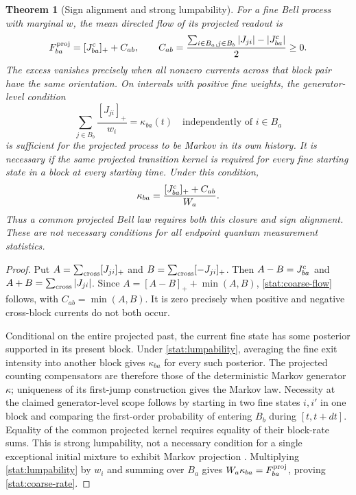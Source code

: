 \documentclass[11pt,oneside,openany]{book}
\newtheorem{theorem}{Theorem}[chapter]
\theoremstyle{definition}
\theoremstyle{remark}\newtheorem{remark}[theorem]{Remark}
\begin{document}
\begin{theorem}[Sign alignment and strong lumpability]
\label{stat:coarse}
For a fine Bell process with marginal $w$, the mean directed flow of its
projected readout is
\begin{equation}\label{stat:coarse-flow}
 F^{\rm proj}_{ba}=[J^{\rm c}_{ba}]_++C_{ab},\qquad
 C_{ab}=\frac{\sum_{i\in B_a,j\in B_b}|J_{ji}|
                    -|J^{\rm c}_{ba}|}{2}\geq0.
\end{equation}
The excess vanishes precisely when all nonzero currents across that block
pair have the same orientation. On intervals with positive fine weights,
the generator-level condition
\begin{equation}\label{stat:lumpability}
 \sum_{j\in B_b}\frac{[J_{ji}]_+}{w_i}=\kappa_{ba}(t)
 \quad\text{independently of }i\in B_a
\end{equation}
is sufficient for the projected process to be Markov in its own history.
It is necessary if the same projected transition kernel is required for
every fine starting state in a block at every starting time. Under this
condition,
\begin{equation}\label{stat:coarse-rate}
 \kappa_{ba}=\frac{[J^{\rm c}_{ba}]_++C_{ab}}{W_a}.
\end{equation}
Thus a common projected Bell law requires both this closure and sign
alignment. These are not necessary conditions for all endpoint quantum
measurement statistics.
\end{theorem}
\begin{proof}
Put $A=\sum_{\rm cross}[J_{ji}]_+$ and
$B=\sum_{\rm cross}[-J_{ji}]_+$. Then
$A-B=J^{\rm c}_{ba}$ and $A+B=\sum_{\rm cross}|J_{ji}|$. Since
$A=[A-B]_++\min(A,B)$, \eqref{stat:coarse-flow} follows, with
$C_{ab}=\min(A,B)$. It is zero precisely when positive and negative
cross-block currents do not both occur.

Conditional on the entire projected past, the current fine state has some
posterior supported in its present block. Under
\eqref{stat:lumpability}, averaging the fine exit intensity into another
block gives $\kappa_{ba}$ for every such posterior. The projected counting
compensators are therefore those of the deterministic Markov generator
$\kappa$; uniqueness of its first-jump construction gives the Markov law.
Necessity at the claimed generator-level scope follows by starting in two
fine states $i,i'$ in one block and comparing the first-order probability
of entering $B_b$ during $[t,t+dt]$. Equality of the common projected
kernel requires equality of their block-rate sums. This is strong
lumpability, not a necessary condition for a single exceptional initial
mixture to exhibit Markov projection \cite{F06}.
Multiplying \eqref{stat:lumpability} by $w_i$ and summing over $B_a$ gives
$W_a\kappa_{ba}=F^{\rm proj}_{ba}$, proving \eqref{stat:coarse-rate}.
\end{proof}
\end{document}
